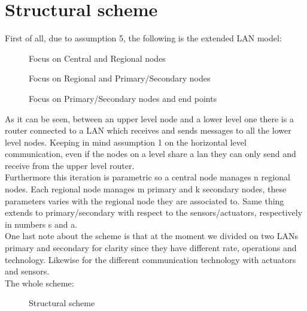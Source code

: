 \documentclass[11pt]{article}
\begin{document}
\section{Structural scheme}
First of all, due to assumption 5, the following is the extended LAN model:\\
\begin{figure}[H]
	\hspace*{-3.75cm}
	\centering
  \frame{}
  \caption{Focus on Central and Regional nodes}
\end{figure}
\begin{figure}[H]
	\hspace*{-3.75cm}
	\frame{}
	\caption{Focus on Regional and Primary/Secondary nodes}
\end{figure}
\begin{figure}[H]
	\hspace*{-3.75cm}
  \frame{}
  \caption{Focus on Primary/Secondary nodes and end points}
\end{figure}
As it can be seen, between an upper level node and a lower level one there is a router connected to a LAN which receives and sends messages to all the lower level nodes. Keeping in mind assumption 1 on the horizontal level communication, even if the nodes on a level share a lan they can only send and receive from the upper level router.\\
Furthermore this iteration is parametric so a central node manages n regional nodes. Each regional node manages m primary and k secondary nodes, these parameters varies with the regional node they are associated to. Same thing extends to primary/secondary with respect to the sensors/actuators, respectively in numbers s and a.\\
One last note about the scheme is that at the moment we divided on two LANs primary and secondary for clarity since they have different rate, operations and technology. Likewise for the different communication technology with actuators and sensors.\\
The whole scheme:
\begin{figure}[H]
	\hspace*{-3.75cm}
	\frame{}
  \caption{Structural scheme}
\end{figure}
\end{document}

